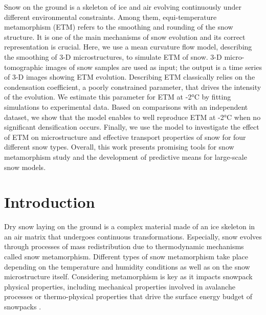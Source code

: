 \documentclass[draft,ms]{agujournal2019}
\begin{document}
Snow on the ground is a skeleton of ice and air evolving continuously under different environmental constraints. Among them, equi-temperature metamorphism (ETM) refers to the smoothing and rounding of the snow structure. It is one of the main mechanisms of snow evolution and its correct representation is crucial. Here, we use a mean curvature flow model, describing the smoothing of 3-D microstructures, to simulate ETM of snow. 3-D micro-tomographic images of snow samples are used as input; the output is a time series of 3-D images showing ETM evolution. Describing ETM classically relies on the condensation coefficient, a poorly constrained parameter, that drives the intensity of the evolution. We estimate this parameter for ETM at -2°C by fitting simulations to experimental data. Based on comparisons with an independent dataset, we show that the model enables to well reproduce ETM at -2°C when no significant densification occurs. Finally, we use the model to investigate the effect of ETM on microstructure and effective transport properties of snow for four different snow types. Overall, this work presents promising tools for snow metamorphism study and the development of predictive means for large-scale snow models.

\section{Introduction}
\label{sec:intro}
Dry snow laying on the ground is a complex material made of an ice skeleton in an air matrix that undergoes continuous transformations. Especially, snow evolves through processes of mass redistribution due to thermodynamic mechanisms called snow metamorphism. Different types of snow metamorphism take place depending on the temperature and humidity conditions as well as on the snow microstructure itself. Considering metamorphism is key as it impacts snowpack physical properties, including mechanical properties involved in avalanche processes or thermo-physical properties that drive the surface energy budget of snowpacks \cite{lehning_physical_2002, vionnet_detailed_2012}.\\
\end{document}
